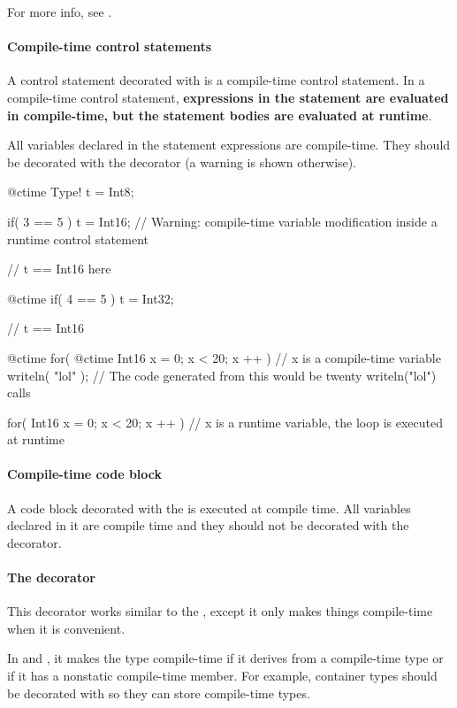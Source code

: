 For more info, see .

\paragraph{Compile-time control statements}
A control statement decorated with  is a compile-time control statement. In a compile-time control statement, \textbf{expressions in the statement are evaluated in compile-time, but the statement bodies are evaluated at runtime}.

All variables declared in the statement expressions are compile-time. They should be decorated with the  decorator (a warning is shown otherwise).

\begin{code}
@ctime Type! t = Int8;

if( 3 == 5 )
	t = Int16; // Warning: compile-time variable modification inside a runtime control statement

// t == Int16 here

@ctime if( 4 == 5 )	
	t = Int32;
	
// t == Int16
\end{code}

\begin{code}
@ctime for( @ctime Int16 x = 0; x < 20; x ++ ) {
	// x is a compile-time variable
	writeln( "lol" );
	// The code generated from this would be twenty writeln("lol") calls
}

for( Int16 x = 0; x < 20; x ++ ) {
	// x is a runtime variable, the loop is executed at runtime	
}
\end{code}

\paragraph{Compile-time code block} A code block decorated with the  is executed at compile time. All variables declared in it are compile time and they should not be decorated with the  decorator.

\paragraph{The  decorator} \label{decorator:autoCtime} This decorator works similar to the , except it only makes things compile-time when it is convenient.

In  and , it makes the type compile-time if it derives from a compile-time type or if it has a nonstatic compile-time member. For example, container types should be decorated with  so they can store compile-time types.


